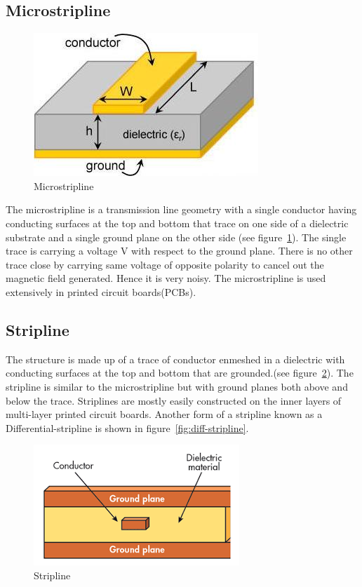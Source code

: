 \subsection{Microstripline}
\begin{figure}[h]
\centering
\includegraphics[scale=0.6]{./graphics/ms (1)}
\caption{Microstripline}
\label{fig:micro}
\end{figure}

The microstripline is a transmission line geometry with a single conductor having conducting surfaces at the top and bottom that trace on one side of a dielectric substrate and a single ground plane on the other side (see figure~\ref{fig:micro}). The single trace is carrying a voltage V with respect to the ground plane. There is no other trace close by carrying same voltage of opposite polarity to cancel out the magnetic field generated. Hence it is very noisy. The microstripline is used extensively in printed circuit boards(PCBs).


\subsection{Stripline} 
The structure is made up of a trace of conductor enmeshed in a dielectric with conducting surfaces at the top and bottom that are grounded.(see figure~\ref{fig:stripline}). The stripline is similar to the microstripline but with ground planes both above and below the trace. Striplines are mostly easily constructed on the inner layers of multi-layer printed circuit boards. Another form of a stripline known as a Differential-stripline is shown in figure~\ref{fig:diff-stripline}.
\begin{figure}[h]
\centering
\includegraphics[scale=0.6]{./graphics/micro}
\caption{ Stripline}
\label{fig:stripline}
\end{figure}

